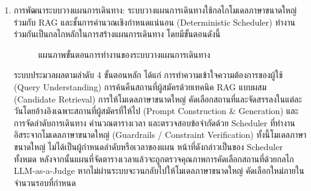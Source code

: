 \begin{enumerate}
\item การพัฒนาระบบวางแผนการเดินทาง: ระบบวางแผนการเดินทางใช้กลไกโมเดลภาษาขนาดใหญ่ ร่วมกับ RAG และชั้นการคำนวณเชิงกำหนดแน่นอน (Deterministic Scheduler) ทำงานร่วมกันเป็นกลไกหลักในการสร้างแผนการเดินทาง โดยมีขั้นตอนดังนี้

\begin{figure}[H]
\centering
{}
\caption{แผนภาพขั้นตอนการทำงานของระบบวางแผนการเดินทาง}
\end{figure}

ระบบประมวลผลตามลำดับ 4 ขั้นตอนหลัก ได้แก่ การทำความเข้าใจความต้องการของผู้ใช้ (Query Understanding) การค้นคืนสถานที่ผู้สมัครด้วยเทคนิค RAG แบบผสม (Candidate Retrieval) การให้โมเดลภาษาขนาดใหญ่ คัดเลือกสถานที่และจัดสรรลงในแต่ละวันโดยอ้างอิงเฉพาะสถานที่ผู้สมัครที่ให้ไป (Prompt Construction \& Generation) และการจัดลำดับการเดินทาง คำนวณตารางเวลา และตรวจสอบข้อจำกัดด้วย Scheduler ที่ทำงานอิสระจากโมเดลภาษาขนาดใหญ่ (Guardrails / Constraint Verification) ทั้งนี้โมเดลภาษาขนาดใหญ่ ไม่ได้เป็นผู้กำหนดลำดับหรือเวลาของแผน หน้าที่ดังกล่าวเป็นของ Scheduler ทั้งหมด หลังจากนั้นแผนที่จัดตารางเวลาแล้วจะถูกตรวจคุณภาพการคัดเลือกสถานที่ด้วยกลไก LLM-as-a-Judge หากไม่ผ่านระบบจะวนกลับไปให้โมเดลภาษาขนาดใหญ่ คัดเลือกใหม่ภายในจำนวนรอบที่กำหนด


\end{enumerate}

